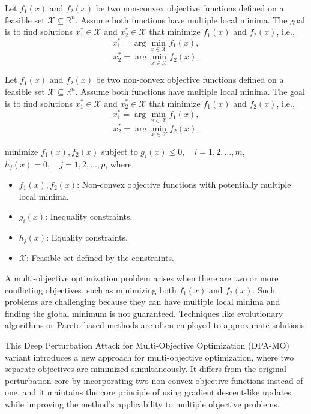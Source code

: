 Let \( f_1(x) \) and \( f_2(x) \) be two non-convex objective functions defined on a feasible set \( \mathcal{X} \subseteq \mathbb{R}^n \). Assume both functions have multiple local minima. The goal is to find solutions \( x_1^* \in \mathcal{X} \) and \( x_2^* \in \mathcal{X} \) that minimize \( f_1(x) \) and \( f_2(x) \), i.e.,  
\[
x_1^* = \arg \min_{x \in \mathcal{X}} f_1(x),
\]
\[
x_2^* = \arg \min_{x \in \mathcal{X}} f_2(x).
\]


Let \( f_1(x) \) and \( f_2(x) \) be two non-convex objective functions defined on a feasible set \( \mathcal{X} \subseteq \mathbb{R}^n \). Assume both functions have multiple local minima.
The goal is to find solutions \( x_1^* \in \mathcal{X} \) and \( x_2^* \in \mathcal{X} \) that minimize \( f_1(x) \) and \( f_2(x) \), i.e.,
\[
x_1^* = \arg \min_{x \in \mathcal{X}} f_1(x),
\]
\[
x_2^* = \arg \min_{x \in \mathcal{X}} f_2(x).
\]

minimize  $f_1(x), f_2(x)$
subject to 
$g_i(x) \leq 0, \quad i = 1, 2, \ldots, m$,
$h_j(x) = 0, \quad j = 1, 2, \ldots, p$,
where:
\begin{itemize}
    \item \( f_1(x), f_2(x) \): Non-convex objective functions with potentially multiple local minima.
    \item \( g_i(x) \): Inequality constraints.
    \item \( h_j(x) \): Equality constraints.
    \item \( \mathcal{X} \): Feasible set defined by the constraints.
\end{itemize}

A multi-objective optimization problem arises when there are two or more conflicting objectives, such as minimizing both \( f_1(x) \) and \( f_2(x) \). Such problems are challenging because they can have multiple local minima and finding the global minimum is not guaranteed. Techniques like evolutionary algorithms or Pareto-based methods are often employed to approximate solutions.

This Deep Perturbation Attack for Multi-Objective Optimization (DPA-MO) variant introduces a new approach for multi-objective optimization, where two separate objectives are minimized simultaneously. It differs from the original perturbation core by incorporating two non-convex objective functions instead of one, and it maintains the core principle of using gradient descent-like updates while improving the method's applicability to multiple objective problems.